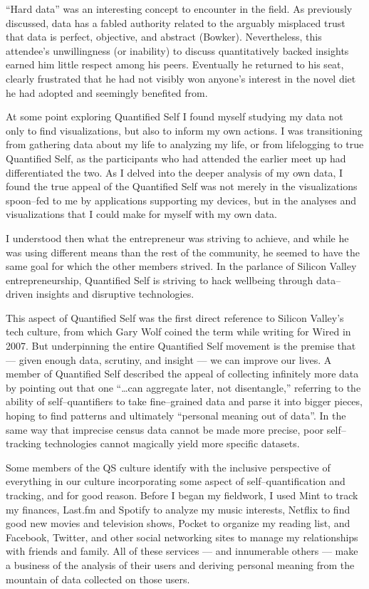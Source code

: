 \documentclass{article}
\begin{document}
``Hard data'' was an interesting concept to encounter in the field.
As previously discussed,
data has a fabled authority related to the arguably misplaced trust that data is perfect,
objective,
and abstract
(Bowker). 
Nevertheless,
this attendee's unwillingness (or inability) to discuss quantitatively backed insights earned him little respect among his peers. 
Eventually he returned to his seat,
clearly frustrated that he had not visibly won anyone's interest in the novel diet he had adopted and seemingly benefited from.

At some point exploring Quantified Self I found myself studying my data not only to find visualizations,
but also to inform my own actions.
I was transitioning from gathering data about my life to analyzing my life,
or from lifelogging to true Quantified Self,
as the participants who had attended the earlier meet up had differentiated the two.
As I delved into the deeper analysis of my own data,
I found the true appeal of the Quantified Self was not merely in the visualizations spoon--fed to me by applications supporting my devices,
but in the analyses and visualizations that I could make for myself with my own data.

I understood then what the entrepreneur was striving to achieve,
and while he was using different means than the rest of the community,
he seemed to have the same goal for which the other members strived.
In the parlance of Silicon Valley entrepreneurship,
Quantified Self is striving to hack wellbeing through data--driven insights and disruptive technologies.

This aspect of Quantified Self was the first direct reference to Silicon Valley's tech culture,
from which Gary Wolf coined the term while writing for Wired in 2007.
But underpinning the entire Quantified Self movement is the premise that
--- given enough data,
scrutiny,
and insight
--- we can improve our lives.
A member of Quantified Self described the appeal of collecting infinitely more data by pointing out that one ``\dots can aggregate later,
not disentangle,'' referring to the ability of self--quantifiers to take fine--grained data and parse it into bigger pieces,
hoping to find patterns and ultimately ``personal meaning out of data''.
In the same way that imprecise census data cannot be made more precise,
poor self--tracking technologies cannot magically yield more specific datasets.

Some members of the QS culture identify with the inclusive perspective of everything in our culture incorporating some aspect of self--quantification and tracking,
and for good reason.
Before I began my fieldwork,
I used Mint to track my finances,
Last.fm and Spotify to analyze my music interests,
Netflix to find good new movies and television shows,
Pocket to organize my reading list,
and Facebook,
Twitter,
and other social networking sites to manage my relationships with friends and family.
All of these services
--- and innumerable others ---
make a business of the analysis of their users and deriving personal meaning from the mountain of data collected on those users.
\end{document}
